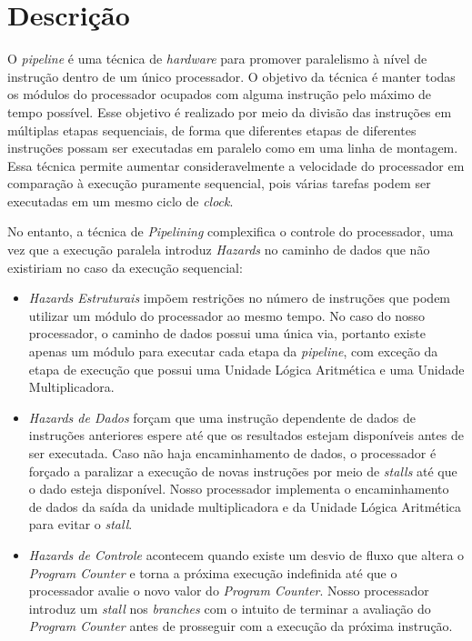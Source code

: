 \documentclass[11pt,a4paper,titlepage]{article}
\begin{document}
\section{Descrição}\label{sec:desc}

O \textit{pipeline} é uma técnica de \textit{hardware} para promover paralelismo
à nível de instrução dentro de um único processador. O objetivo da técnica é 
manter todas os módulos do processador ocupados com alguma instrução pelo
máximo de tempo possível. Esse objetivo é realizado por meio da divisão das 
instruções em múltiplas etapas sequenciais, de forma que diferentes etapas de
diferentes instruções possam ser executadas em paralelo como em uma linha de 
montagem. Essa técnica permite aumentar consideravelmente a velocidade do processador
em comparação à execução puramente sequencial, pois várias tarefas podem ser
executadas em um mesmo ciclo de \textit{clock}.

No entanto, a técnica de \textit{Pipelining} complexifica o controle do 
processador, uma vez que a execução paralela introduz \textit{Hazards} no caminho
de dados que não existiriam no caso da execução sequencial:

\begin{itemize}

\item \textit{Hazards Estruturais} impõem restrições no número de instruções que podem
utilizar um módulo do processador ao mesmo tempo. No caso do nosso processador,
o caminho de dados possui uma única via, portanto existe apenas um módulo para 
executar cada etapa da \textit{pipeline}, com exceção da etapa de execução que
possui uma Unidade Lógica Aritmética e uma Unidade Multiplicadora.

\item \textit{Hazards de Dados} forçam que uma instrução dependente de dados
de instruções anteriores espere até que os resultados estejam disponíveis antes
de ser executada. Caso não haja encaminhamento de dados, o processador é forçado
a paralizar a execução de novas instruções por meio de \textit{stalls} até que
o dado esteja disponível. Nosso processador implementa o encaminhamento de dados
da saída da unidade multiplicadora e da Unidade Lógica Aritmética para evitar
o \textit{stall}.

\item \textit{Hazards de Controle} acontecem quando existe um desvio de fluxo
que altera o \textit{Program Counter} e torna a próxima execução indefinida até
que o processador avalie o novo valor do \textit{Program Counter}. Nosso processador
introduz um \textit{stall} nos \textit{branches} com o intuito de terminar a 
avaliação do \textit{Program Counter} antes de prosseguir com a execução da próxima
instrução.

\end{itemize}
\end{document}

